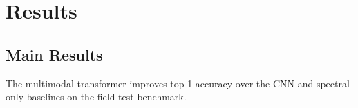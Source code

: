 \section{Results}
\subsection{Main Results}
The multimodal transformer improves top-1 accuracy over the CNN and spectral-only baselines on the field-test benchmark.
